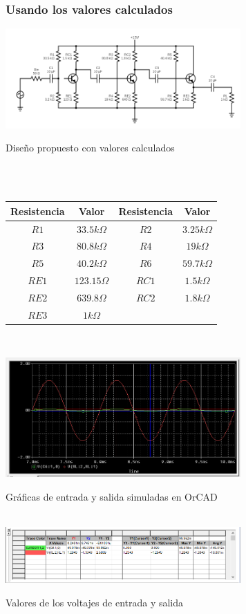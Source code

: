 \documentclass[conference]{IEEEtran}
\begin{document}
\subsubsection{Usando los valores calculados}
\includegraphics[width=9cm]{imagenes/valores_reales.png}
\begin{center}
\caption{Diseño propuesto con valores calculados}\\
\hspace{1cm}\\
\begin{tabular}{|c c c c|}
		\hline
		Resistencia & Valor & Resistencia & Valor \\ [1ex]
		\hline\hline
		$R1$ & $33.5k\Omega$ & $R2$ & $3.25k\Omega$\\
        $R3$ & $80.8k\Omega$ & $R4$ & $19k\Omega$\\
        $R5$ & $40.2k\Omega$ & $R6$ & $59.7k\Omega$\\
        $RE1$ & $123.15\Omega$ & $RC1$ & $1.5k\Omega$\\
        $RE2$ & $639.8\Omega$ & $RC2$ & $1.8k\Omega$\\
        $RE3$ & $1k\Omega$ & \hspace{1cm} & \hspace{1cm}\\
		\hline
\end{tabular}
\hspace{1cm}\\    
\end{center}
\begin{center}
\includegraphics[width=9cm]{imagenes/simulacionrealgraph.png}
\caption{Gráficas de entrada y salida simuladas en OrCAD}\\
\includegraphics[width=9cm]{imagenes/simulacionrealdata.png}
\caption{Valores de los voltajes de entrada y salida}\\
\end{center}
\hspace{1cm}\\
\end{document}
